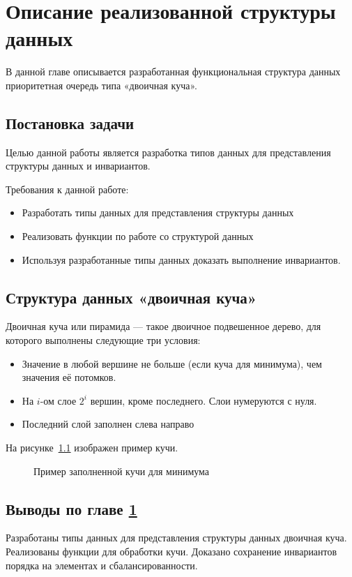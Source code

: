 \chapter{Описание реализованной структуры данных}
\label{chapter2}

В данной главе описывается разработанная функциональная структура данных приоритетная очередь типа «двоичная куча».

\section{Постановка задачи}
Целью данной работы является разработка типов данных для представления
структуры данных и инвариантов.

Требования к данной работе:
\begin{itemize}
 \item Разработать типы данных для представления структуры данных
 \item Реализовать функции по работе со структурой данных
 \item Используя разработанные типы данных доказать выполнение инвариантов.
\end{itemize}

\section{Структура данных «двоичная куча»}

\begin{definition}
Двоичная куча или пирамида \cite{DBLP:books/mg/CormenLRS01} — такое двоичное подвешенное дерево, для которого выполнены следующие три условия:
\begin{itemize}
 \item Значение в любой вершине не больше (если куча для минимума), чем значения её потомков.
 \item На $i$-ом слое $2^i$ вершин, кроме последнего. Слои нумеруются с нуля.
 \item Последний слой заполнен слева направо %
\end{itemize}
\end{definition}
На рисунке~\ref{pic:min-heap} изображен пример кучи.
\begin{figure}[h!]
  \caption{Пример заполненной кучи для минимума}
  \label{pic:min-heap}
\end{figure} 


\section{Выводы по главе \ref{chapter2}}

Разработаны типы данных для представления структуры данных двоичная куча.
Реализованы функции для обработки кучи.
Доказано сохранение инвариантов порядка на элементах и сбалансированности.
